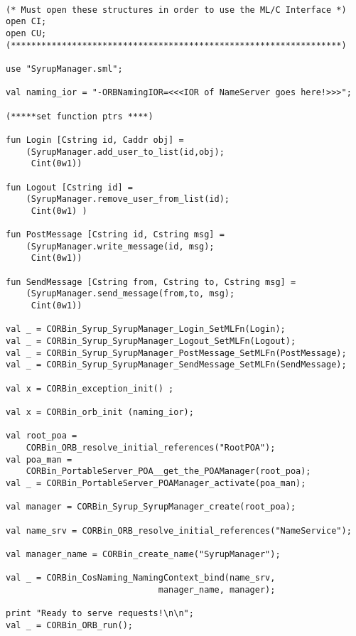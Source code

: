 \begin{verbatim}

(* Must open these structures in order to use the ML/C Interface *)
open CI;
open CU;
(*****************************************************************)

use "SyrupManager.sml";

val naming_ior = "-ORBNamingIOR=<<<IOR of NameServer goes here!>>>";

(*****set function ptrs ****)

fun Login [Cstring id, Caddr obj] = 
    (SyrupManager.add_user_to_list(id,obj);
     Cint(0w1))

fun Logout [Cstring id] = 
    (SyrupManager.remove_user_from_list(id);
     Cint(0w1) )

fun PostMessage [Cstring id, Cstring msg] = 
    (SyrupManager.write_message(id, msg);
     Cint(0w1))

fun SendMessage [Cstring from, Cstring to, Cstring msg] = 
    (SyrupManager.send_message(from,to, msg);
     Cint(0w1))

val _ = CORBin_Syrup_SyrupManager_Login_SetMLFn(Login);
val _ = CORBin_Syrup_SyrupManager_Logout_SetMLFn(Logout);
val _ = CORBin_Syrup_SyrupManager_PostMessage_SetMLFn(PostMessage);
val _ = CORBin_Syrup_SyrupManager_SendMessage_SetMLFn(SendMessage);

val x = CORBin_exception_init() ;

val x = CORBin_orb_init (naming_ior);

val root_poa = 
    CORBin_ORB_resolve_initial_references("RootPOA");
val poa_man = 
    CORBin_PortableServer_POA__get_the_POAManager(root_poa);
val _ = CORBin_PortableServer_POAManager_activate(poa_man);

val manager = CORBin_Syrup_SyrupManager_create(root_poa);

val name_srv = CORBin_ORB_resolve_initial_references("NameService");

val manager_name = CORBin_create_name("SyrupManager");

val _ = CORBin_CosNaming_NamingContext_bind(name_srv, 
                              manager_name, manager);

print "Ready to serve requests!\n\n";
val _ = CORBin_ORB_run(); 


\end{verbatim}

